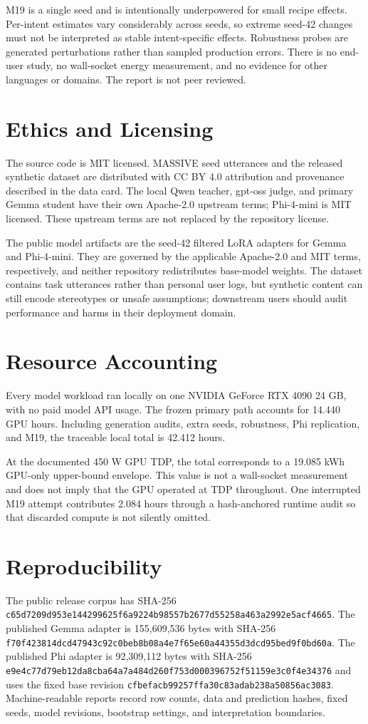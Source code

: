 \documentclass[11pt]{article}
\begin{document}
M19 is a single seed and is intentionally underpowered for small recipe effects.
Per-intent estimates vary considerably across seeds, so extreme seed-42 changes
must not be interpreted as stable intent-specific effects.  Robustness probes
are generated perturbations rather than sampled production errors.  There is no
end-user study, no wall-socket energy measurement, and no evidence for other
languages or domains.  The report is not peer reviewed.

\section{Ethics and Licensing}
The source code is MIT licensed.  MASSIVE seed utterances and the released
synthetic dataset are distributed with CC BY 4.0 attribution and provenance
described in the data card.  The local Qwen teacher, gpt-oss judge, and primary
Gemma student have their own Apache-2.0 upstream terms; Phi-4-mini is MIT
licensed.  These upstream terms are not replaced by the repository license.

The public model artifacts are the seed-42 filtered LoRA adapters for Gemma and
Phi-4-mini.  They are governed by the applicable Apache-2.0 and MIT terms,
respectively, and neither repository redistributes base-model weights.  The
dataset contains task utterances rather than personal user logs, but synthetic
content can still encode stereotypes or unsafe assumptions; downstream users
should audit performance and harms in their deployment domain.

\section{Resource Accounting}
Every model workload ran locally on one NVIDIA GeForce RTX 4090 24 GB, with no
paid model API usage.  The frozen primary path accounts for 14.440 GPU hours.
Including generation audits, extra seeds, robustness, Phi replication, and M19,
the traceable local total is 42.412 hours.

At the documented 450 W GPU TDP, the total corresponds to a 19.085 kWh
GPU-only upper-bound envelope.  This value is not a wall-socket measurement and
does not imply that the GPU operated at TDP throughout.  One interrupted M19
attempt contributes 2.084 hours through a hash-anchored runtime audit so that
discarded compute is not silently omitted.

\section{Reproducibility}
The public release corpus has SHA-256
\nolinkurl{c65d7209d953e144299625f6a9224b98557b2677d55258a463a2992e5acf4665}.
The published Gemma adapter is 155,609,536 bytes with SHA-256
\nolinkurl{f70f423814dcd47943c92c0beb8b08a4e7f65e60a44355d3dcd95bed9f0bd60a}.
The published Phi adapter is 92,309,112 bytes with SHA-256
\nolinkurl{e9e4c77d79eb12da8cba64a7a484d260f753d000396752f51159e3c0f4e34376}
and uses the fixed base revision
\nolinkurl{cfbefacb99257ffa30c83adab238a50856ac3083}.
Machine-readable reports record row counts, data and prediction hashes, fixed
seeds, model revisions, bootstrap settings, and interpretation boundaries.
\end{document}
